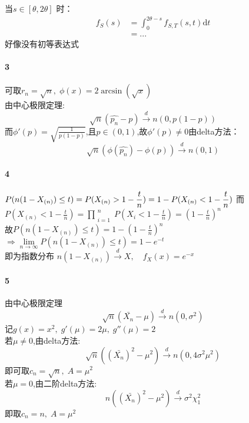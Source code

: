 \documentclass[11pt,a4paper]{ctexart}
\begin{document}
当\(s \in [\theta, 2\theta]\) 时：
\begin{equation*}
\begin{split}
f_S(s) & = \int_{0}^{2\theta - s}f_{S,T}(s,t)\mathrm{d}t \\
& = ...
\end{split}
\end{equation*}
好像没有初等表达式
\paragraph{3}
可取\(r_n = \sqrt{n} ,\; \phi(x) = 2\arcsin(\sqrt{x})\)\\
由中心极限定理:
\[ \sqrt{n}(\hat{p_n} - p) \overset{d}{\to} n(0,p(1 - p))\]
而$\phi'(p) = \sqrt{\frac{1}{p(1 - p)}}$,且$p \in (0 , 1)$,故$\phi'(p) \neq 0 $由delta方法：
\[ \sqrt{n}(\phi(\hat{p_n}) - \phi(p)) \overset{d}{\to} n(0,1)\]
\paragraph{4}
$\displaystyle
P(n(1 - X_{(n)}) \leq t)  = P(X_{(n)} > 1 - \frac{t}{n}) = 1 - P(X_{(n)} < 1 - \frac{t}{n})\\$
而$\displaystyle P(X_{(n)} < 1 - \frac{t}{n}) = \prod_{\substack{i = 1}}^{\substack{n}} P(X_i < 1 - \frac{t}{n}) = (1 - \frac{t}{n})^n $\\
故$\displaystyle P(n(1 - X_{(n)}) \leq t) = 1 - (1 - \frac{t}{n})^n $ \\
 \(\Rightarrow \lim\limits_{n\to \infty}P(n(1 - X_{(n)}) \leq t) = 1 - e^{-t}\)\\
 即为指数分布 $\displaystyle n(1 - X_{(n)}) \overset{d}{\to} X, \quad f_X(x) = e^{-x}$
 \paragraph{5}
 由中心极限定理 
 \[ \sqrt{n}(\bar{X_n} - \mu) \overset{d}{\to} n(0,\sigma^2)\]
 记\(g(x) = x^2 ,\;g'(\mu) = 2 \mu,\; g''(\mu) = 2\)\\
 若\( \mu \neq 0\),由delta方法:
 \[ \sqrt{n}((\bar{X_n})^2 - \mu^2) \overset{d}{\to} n(0,4\sigma^2\mu^2)\]
 即可取\(c_n = \sqrt{n},\;A = \mu^2\)\\
 若\(\mu = 0\),由二阶delta方法:
 \[n((\bar{X_n})^2 - \mu^2) \overset{d}{\to} \sigma^2\chi^2_1\]
 即取\(c_n = n ,\; A = \mu^2\)
\end{document}
